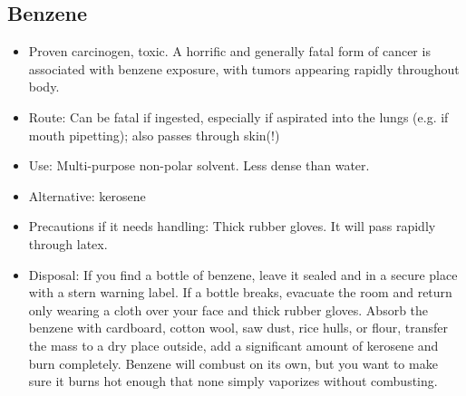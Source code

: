 \subsection{Benzene}
\begin{itemize}
\item{Proven carcinogen, toxic. 
A horrific and generally fatal form of cancer 
is associated with benzene exposure, 
with tumors appearing rapidly throughout body.}
\item{Route: Can be fatal if ingested, 
especially if aspirated into the lungs 
(e.g. if mouth pipetting); also passes through skin(!)}
\item{Use: Multi-purpose non-polar solvent. 
Less dense than water.}
\item{Alternative: kerosene}
\item{Precautions if it needs handling: Thick rubber gloves. 
It will pass rapidly through latex.}
\item{Disposal: If you find a bottle of benzene, 
leave it sealed and in a secure place with a stern warning label. 
If a bottle breaks, 
evacuate the room and return only wearing a cloth over your face 
and thick rubber gloves. 
Absorb the benzene with cardboard, cotton wool, 
saw dust, rice hulls, or flour, 
transfer the mass to a dry place outside, 
add a significant amount of kerosene and burn completely. 
Benzene will combust on its own, 
but you want to make sure it burns hot enough 
that none simply vaporizes without combusting.}
\end{itemize}

